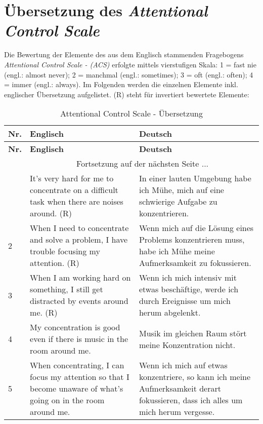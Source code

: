 \section{Übersetzung des \textit{Attentional Control Scale}}\label{appendix.acs}
Die Bewertung der Elemente des aus dem Englisch stammenden Fragebogens \textit{Attentional Control Scale - (ACS)} \cite{Derryberry:2002} erfolgte mittels vierstufigen Skala: 1 = fast nie (engl.: almost never); 2 = manchmal (engl.: sometimes); 3 = oft (engl.: often); 4 = immer (engl.: always).\newline
Im Folgenden werden die einzelnen Elemente inkl. englischer Übersetzung aufgelistet. (R) steht für invertiert bewertete Elemente:
\begin{center}
    \begin{longtable}[t]{|l|p{6.6 cm}|p{6.6 cm}|}
    \caption{Attentional Control Scale - Übersetzung} \\ \hline
        \textbf{Nr.} & \textbf{Englisch} & \textbf{Deutsch} \\ \hline
        \endfirsthead
        \hline
        \textbf{Nr.} & \textbf{Englisch} & \textbf{Deutsch} \\ \hline
        \endhead 
        & \multicolumn{2}{|c|}{Fortsetzung auf der nächsten Seite $...$ } \\ \hline
        \endfoot
        \hline
        \endlastfoot
        1 & It’s very hard for me to concentrate on a difficult task when there are noises around. (R) & In einer lauten Umgebung habe ich Mühe, mich auf eine schwierige Aufgabe zu konzentrieren.\\ 
        2 & When I need to concentrate and solve a problem, I have trouble focusing my attention. (R) & Wenn mich auf die Lösung eines Problems konzentrieren muss, habe ich Mühe meine Aufmerksamkeit zu fokussieren.\\ 
        3 & When I am working hard on something, I still get distracted by events around me. (R) & Wenn ich mich intensiv mit etwas beschäftige, werde ich durch Ereignisse um mich herum abgelenkt.\\ 
        4 & My concentration is good even if there is music in the room around me. & Musik im gleichen Raum stört meine Konzentration nicht.\\
        5 & When concentrating, I can focus my attention so that I become unaware of what’s going on in the room around me. & Wenn ich mich auf etwas konzentriere,  so kann ich meine Aufmerksamkeit derart fokussieren, dass ich alles um mich herum vergesse. \\

\end{longtable}
\end{center}
